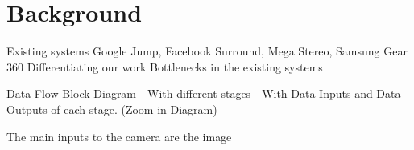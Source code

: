 \chapter{Background}
Existing systems \newline
Google Jump, Facebook Surround, Mega Stereo, Samsung Gear 360 \newline
Differentiating our work \newline
Bottlenecks in the existing systems \newline

Data Flow \newline
Block Diagram
- With different stages
- With Data Inputs and Data Outputs of each stage. (Zoom in Diagram)

The main inputs to the camera are the image 